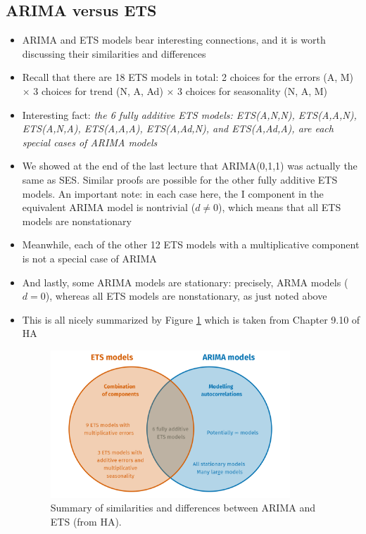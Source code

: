 \documentclass{article}
\begin{document}
\subsection{ARIMA versus ETS}
\begin{itemize}
\item ARIMA and ETS models bear interesting connections, and it is worth
  discussing their similarities and differences

\item Recall that there are 18 ETS models in total: 2 choices for the errors (A,
  M) $\times$ 3 choices for trend (N, A, Ad) $\times$ 3 choices for seasonality
  (N, A, M)

\item Interesting fact: \emph{the 6 fully additive ETS models: ETS(A,N,N), 
    ETS(A,A,N), ETS(A,N,A), ETS(A,A,A), ETS(A,Ad,N), and ETS(A,Ad,A), are each  
    special cases of ARIMA models}

\item We showed at the end of the last lecture that ARIMA(0,1,1) was actually
  the same as SES. Similar proofs are possible for the other fully additive ETS
  models. An important note: in each case here, the I component in the
  equivalent ARIMA model is nontrivial ($d \not= 0$), which means that all ETS 
  models are nonstationary  

\item Meanwhile, each of the other 12 ETS models with a multiplicative component  
  is not a special case of ARIMA 

\item And lastly, some ARIMA models are stationary: precisely, ARMA models ($d =
  0$), whereas all ETS models are nonstationary, as just noted above

\item This is all nicely summarized by Figure \ref{fig:arima_ets} which is taken
  from Chapter 9.10 of HA

\begin{figure}[htb]
\centering
\includegraphics[width=0.85\textwidth]{arima_ets.png}
\caption{Summary of similarities and differences between ARIMA and ETS (from
  HA).} 
\label{fig:arima_ets}
\end{figure}


\end{itemize}
\end{document}
